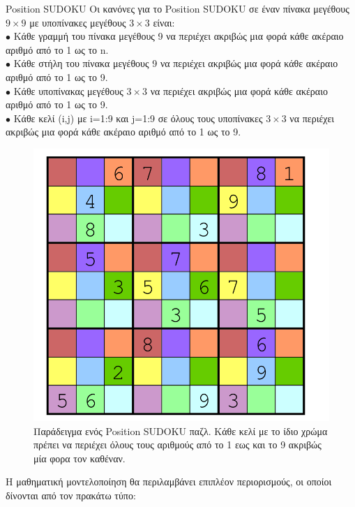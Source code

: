 \documentclass[12pt]{book}
\theoremstyle{definition}
\begin{document}
\begin{mytheorem}{Position SUDOKU}{}
	Οι κανόνες για το Position SUDOKU σε έναν πίνακα μεγέθους \(9 \times 9\) με υποπίνακες μεγέθους \(3 \times 3\) είναι: \\
	\(\bullet\) Κάθε γραμμή του πίνακα μεγέθους 9 να περιέχει ακριβώς μια φορά κάθε ακέραιο αριθμό από το 1 ως το n. \\
	\(\bullet\) Κάθε στήλη του πίνακα μεγέθους 9 να περιέχει ακριβώς μια φορά κάθε ακέραιο αριθμό από το 1 ως το 9. \\
	\(\bullet\) Κάθε υποπίνακας μεγέθους \(3 \times 3\) να περιέχει ακριβώς μια φορά κάθε ακέραιο αριθμό από το 1 ως το 9. \\
	\(\bullet\) Κάθε κελί (i,j) με i=1:9 και j=1:9 σε όλους τους υποπίνακες \(3 \times 3\) να περιέχει ακριβώς μια φορά κάθε ακέραιο αριθμό από το 1 ως το 9.
\end{mytheorem}

\begin{figure}[h]
	\centering	
	\includegraphics[scale=0.4]{Figures/positionSUDOKU.png}
	\caption{Παράδειγμα ενός Position SUDOKU παζλ. Κάθε κελί με το ίδιο χρώμα πρέπει να περιέχει όλους τους αριθμούς από το 1 εως και το 9 ακριβώς μία φορα τον καθέναν.}
\end{figure}

Η μαθηματική μοντελοποίηση θα περιλαμβάνει επιπλέον περιορισμούς, οι οποίοι δίνονται από τον πρακάτω τύπο: 
\end{document}
